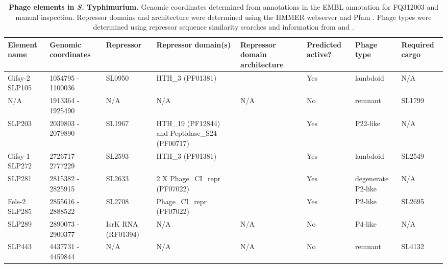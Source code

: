 %
\begin{table}
   \tiny
   \centering
   \noindent
    \caption[Phage elements in {\it S.} Typhimurium]{\textbf{Phage elements in {\it S.} Typhimurium.} Genomic coordinates determined from annotations in the EMBL annotation for FQ312003 and manual inspection. Repressor domains and architecture were determined using the HMMER webserver \parencite{Finn2011} and Pfam \parencite{Punta2012}. Phage types were determined using repressor sequence similarity searches and information from \textcite{Thomson2004} and \textcite{Kropinski2007}. }
    \begin{tabular}{     p{0.5in}
    				p{0.4in}
				p{0.4in}
				p{0.6in}
				l
				p{0.4in}
				p{0.5in}
				p{0.5in}
				}
   
    \\
     \toprule
    \textbf{Element name} & \textbf{Genomic coordinates} & \textbf{Repressor} & \textbf{Repressor domain(s)} & \textbf{Repressor domain architecture} & \textbf{Predicted active?} & \textbf{Phage type} & \textbf{Required cargo} \\
    \midrule
    Gifsy-2 SLP105 & 1054795 - 1100036 & SL0950 & HTH\_3 (PF01381) &       & Yes   & lambdoid & N/A \\
    N/A   & 1913364 - 1925490 & N/A   & N/A   & N/A   & No    & remnant & SL1799 \\
    SLP203 & 2039803 - 2079890 & SL1967 & HTH\_19 (PF12844) and Peptidase\_S24 (PF00717) &       & Yes   & P22-like & N/A \\
    Gifsy-1 SLP272 & 2726717 - 2777229 & SL2593 & HTH\_3 (PF01381) &       & Yes   & lambdoid & SL2549 \\
    SLP281 & 2815382 - 2825915 & SL2633 & 2 X Phage\_CI\_repr (PF07022) &       & Yes   & degenerate P2-like & N/A \\
    Fels-2 SLP285 & 2855616 - 2888522 & SL2708 & Phage\_CI\_repr (PF07022) &       & Yes   & P2-like & SL2695 \\
    SLP289 & 2890073 - 2900377 & IsrK RNA (RF01394) & N/A   & N/A   & No    & P4-like & N/A \\
    SLP443 & 4437731 - 4459844 & N/A   & N/A   & N/A   & No    & remnant & SL4132 \\
    \bottomrule    
    \end{tabular}%
    \label{tab:stm_phage}%
\end{table}


